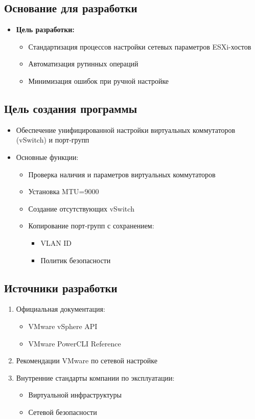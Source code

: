 \subsection{Основание для разработки}
\begin{itemize}
    \item \textbf{Цель разработки:}
    \begin{itemize}
        \item Стандартизация процессов настройки сетевых параметров ESXi-хостов
        \item Автоматизация рутинных операций
        \item Минимизация ошибок при ручной настройке
    \end{itemize}
\end{itemize}

\subsection{Цель создания программы}
\begin{itemize}
    \item Обеспечение унифицированной настройки виртуальных коммутаторов (vSwitch) и порт-групп
    \item Основные функции:
    \begin{itemize}
        \item Проверка наличия и параметров виртуальных коммутаторов
        \item Установка MTU=9000
        \item Создание отсутствующих vSwitch
        \item Копирование порт-групп с сохранением:
        \begin{itemize}
            \item VLAN ID
            \item Политик безопасности
        \end{itemize}
    \end{itemize}
\end{itemize}

\subsection{Источники разработки}
\begin{enumerate}
    \item Официальная документация:
    \begin{itemize}
        \item VMware vSphere API
        \item VMware PowerCLI Reference
    \end{itemize}
    \item Рекомендации VMware по сетевой настройке
    \item Внутренние стандарты компании по эксплуатации:
    \begin{itemize}
        \item Виртуальной инфраструктуры
        \item Сетевой безопасности
    \end{itemize}
\end{enumerate}

